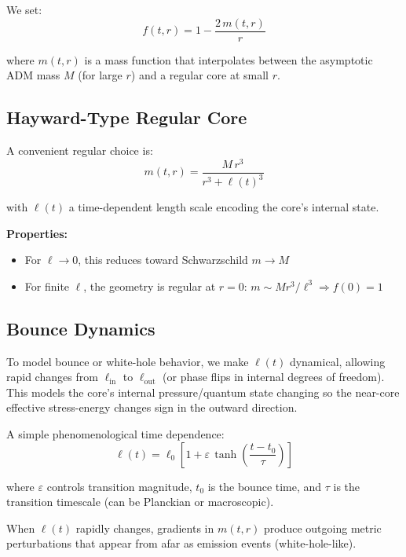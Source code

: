\documentclass[11pt,a4paper]{article}
\begin{document}
We set:
\begin{equation}
f(t,r) = 1 - \frac{2\,m(t,r)}{r}
\end{equation}

where $m(t,r)$ is a mass function that interpolates between the asymptotic ADM mass $M$ (for large $r$) and a regular core at small $r$.

\subsection{Hayward-Type Regular Core}

A convenient regular choice is:
\begin{equation}
m(t,r)=\frac{M\,r^3}{r^3 + \ell(t)^3}
\end{equation}

with $\ell(t)$ a time-dependent length scale encoding the core's internal state.

\textbf{Properties:}
\begin{itemize}
\item For $\ell \to 0$, this reduces toward Schwarzschild $m\to M$
\item For finite $\ell$, the geometry is regular at $r=0$: $m\sim M r^3/\ell^3 \Rightarrow f(0)=1$
\end{itemize}

\subsection{Bounce Dynamics}

To model bounce or white-hole behavior, we make $\ell(t)$ dynamical, allowing rapid changes from $\ell_{\text{in}}$ to $\ell_{\text{out}}$ (or phase flips in internal degrees of freedom). This models the core's internal pressure/quantum state changing so the near-core effective stress-energy changes sign in the outward direction.

A simple phenomenological time dependence:
\begin{equation}
\ell(t) = \ell_0\left[1 + \varepsilon\,\tanh\!\left(\frac{t-t_0}{\tau}\right)\right]
\end{equation}

where $\varepsilon$ controls transition magnitude, $t_0$ is the bounce time, and $\tau$ is the transition timescale (can be Planckian or macroscopic).

When $\ell(t)$ rapidly changes, gradients in $m(t,r)$ produce outgoing metric perturbations that appear from afar as emission events (white-hole-like).
\end{document}
